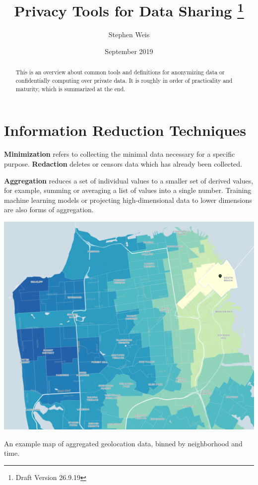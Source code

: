 \documentclass[nobib]{tufte-handout}
\title{Privacy Tools for Data Sharing \thanks{Draft Version 26.9.19}}
\author[Stephen Weis]{Stephen Weis}
\date{September 2019} %
\begin{document}
\maketitle %

\begin{abstract}

\noindent This is an overview about common tools and definitions
for anonymizing data or confidentially computing over private data.
It is roughly in order of practicality and maturity, which is summarized
at the end.
\end{abstract}

\section{Information Reduction Techniques}

\textbf{Minimization} refers to collecting the minimal data necessary for
a specific purpose. \textbf{Redaction} deletes or censors data which has
already been collected.

\textbf{Aggregation} reduces a set of individual values to a smaller set of
derived values, for example, summing or averaging a list of values into a single
number. Training machine learning models or projecting high-dimensional data to
lower dimensions are also forms of aggregation.

\begin{marginfigure} \includegraphics[width=\linewidth]{binned}
\caption{An example map of aggregated geolocation data, binned by neighborhood
and time.}
\label{fig:binned} \end{marginfigure}
\end{document}
